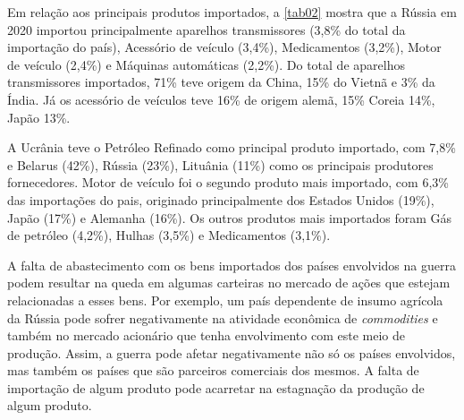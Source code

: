 \documentclass[
article, %
12pt, %
oneside, %
a4paper, %
portuguese, %
portuguese %
]{abntex2}
\begin{document}
Em relação aos principais produtos importados, a \autoref{tab02} mostra que a Rússia em 2020 importou principalmente aparelhos transmissores (3,8\% do total da importação do país), Acessório de veículo (3,4\%), Medicamentos (3,2\%), Motor de veículo (2,4\%) e Máquinas automáticas (2,2\%). Do total de aparelhos transmissores importados, 71\% teve origem da China, 15\% do Vietnã e 3\% da Índia. Já os acessório de veículos teve 16\% de origem alemã, 15\% Coreia 14\%, Japão 13\%.

A Ucrânia teve o Petróleo Refinado como principal produto importado, com 7,8\% e Belarus (42\%), Rússia (23\%), Lituânia (11\%) como os principais produtores fornecedores. Motor de veículo foi o segundo produto mais importado, com 6,3\% das importações do pais, originado principalmente dos Estados Unidos (19\%), Japão (17\%) e Alemanha (16\%). Os outros produtos mais importados foram Gás de petróleo (4,2\%), Hulhas (3,5\%) e Medicamentos (3,1\%).

A falta de abastecimento com os bens importados dos países envolvidos na guerra podem resultar na queda em algumas carteiras no mercado de ações que estejam relacionadas a esses bens. Por exemplo, um país dependente de insumo agrícola da Rússia pode sofrer negativamente na atividade econômica de \textit{commodities} e também no mercado acionário que tenha envolvimento com este meio de produção. Assim, a guerra pode afetar negativamente não só os países envolvidos, mas também os países que são parceiros comerciais dos mesmos. A falta de importação de algum produto pode acarretar na estagnação da produção de algum produto.
\end{document}
